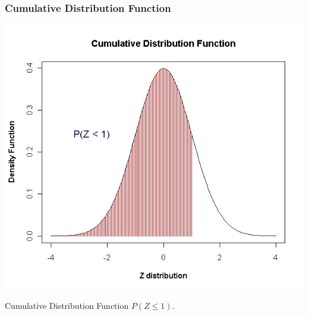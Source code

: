 \begin{frame}
\frametitle{Cumulative Distribution Function}

\vspace{-0.5cm}
\begin{center}
\includegraphics[scale=0.35]{images/6ACDF}

\end{center}
Cumulative Distribution Function $P(Z \leq 1)$.
\end{frame}


